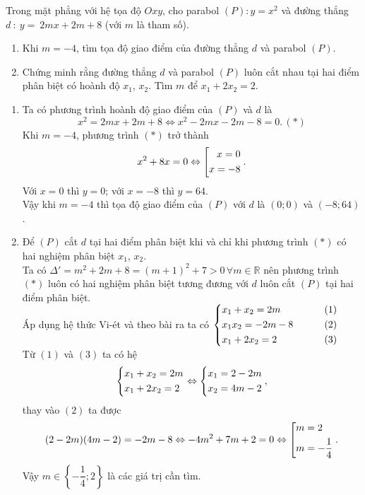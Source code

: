 \begin{ex}%
Trong mặt phẳng với hệ tọa độ $Oxy$, cho parabol $(P): y=x^2$ và đường thẳng $d~:~y=~2mx+2m+8$ (với $m$ là tham số).
	\hfill 
    \begin{enumerate}       
        \item Khi $m=-4$, tìm tọa độ giao điểm của đường thẳng $d$ và parabol $(P)$.
        \item Chứng minh rằng đường thẳng $d$ và parabol $(P)$ luôn cắt nhau tại hai điểm phân biệt có hoành độ $x_1$, $x_2$. Tìm $m$ để $x_1+2x_2=2$. 
    \end{enumerate}
\loigiai
    {
    \begin{enumerate}
        \item Ta có phương trình hoành độ giao điểm của $(P)$ và $d$ là
        $$x^2=2mx+2m+8\Leftrightarrow x^2-2mx-2m-8=0.\, (*)$$ 
        Khi $m=-4$, phương trình $(*)$ trở thành
        $$x^2+8x=0\Leftrightarrow \left[\begin{aligned}x=0\\ x=-8\end{aligned}\right..$$
        Với $x=0$ thì $y=0$; với $x=-8$ thì $y=64$.\\
        Vậy khi $m=-4$ thì tọa độ giao điểm của $(P)$ với $d$ là $(0;0)$ và $(-8;64)$.
        \item Để $(P)$ cắt $d$ tại hai điểm phân biệt  khi và chỉ khi phương trình $(*)$ có hai nghiệm phân biệt $x_1$, $x_2$.\\
        Ta có $\Delta'=m^2+2m+8=(m+1)^2+7>0\, \forall m\in \mathbb{R}$ nên phương trình $(*)$ luôn có hai nghiệm phân biệt tương đương với $d$ luôn cắt $(P)$ tại hai điểm phân biệt.\\
        Áp dụng hệ thức Vi-ét và theo bài ra ta có $\left\{\begin{aligned}&x_1+x_2=2m \quad\quad &(1)\\ &x_1x_2=-2m-8 \quad\quad\, &(2)\\ &x_1+2x_2=2 \quad\quad\, &(3)\end{aligned}\right.$\\
        Từ $(1)$ và $(3)$ ta có hệ 
        $$\left\{\begin{aligned}&x_1+x_2=2m\\ &x_1+2x_2=2\end{aligned}\right.\Leftrightarrow \left\{\begin{aligned}x_1=2-2m\\ x_2=4m-2\end{aligned}\right.,$$
        thay vào $(2)$ ta được 
        $$(2-2m)(4m-2)=-2m-8\Leftrightarrow -4m^2+7m+2=0\Leftrightarrow \left[\begin{aligned}&m=2\\ &m=-\dfrac{1}{4}\end{aligned}\right..$$
        Vậy $m\in \left\{-\dfrac{1}{4};2\right\}$ là các giá trị cần tìm.
    \end{enumerate}
    }
\end{ex}

